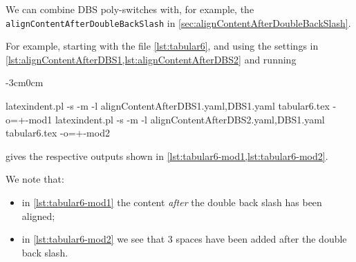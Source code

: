 \documentclass[10pt]{article}
\newenvironment{widepage}{\begin{adjustwidth}{-3cm}{0cm}}{\end{adjustwidth}}
\begin{document}
  \begin{example}
  We can combine DBS poly-switches with, for example, the
  \texttt{alignContentAfterDoubleBackSlash} in
  \vref{sec:alignContentAfterDoubleBackSlash}.

  For example, starting with the file \cref{lst:tabular6}, and using the settings in
  \vref{lst:alignContentAfterDBS1,lst:alignContentAfterDBS2} and running
  \begin{widepage}

   \begin{commandshell}
latexindent.pl -s -m -l alignContentAfterDBS1.yaml,DBS1.yaml tabular6.tex -o=+-mod1
latexindent.pl -s -m -l alignContentAfterDBS2.yaml,DBS1.yaml tabular6.tex -o=+-mod2
\end{commandshell}

  \end{widepage}
  gives the respective outputs shown in \cref{lst:tabular6-mod1,lst:tabular6-mod2}.
  \begin{cmhtcbraster}[raster columns=3,
    raster left skip=-3.5cm,
    raster right skip=-2cm,
    raster column skip=.03\linewidth]
  \end{cmhtcbraster}
  We note that:
  \begin{itemize}
   \item in \cref{lst:tabular6-mod1} the content \emph{after} the double back slash has
         been aligned;
   \item in \cref{lst:tabular6-mod2} we see that 3 spaces have been added after the
         double back slash.
  \end{itemize}
  \end{example}
\end{document}
